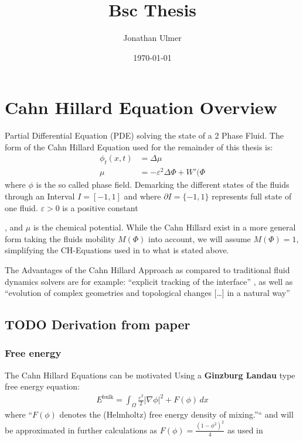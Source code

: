 \documentclass[11pt]{article}
\author{Jonathan Ulmer}
\date{\today}
\title{Bsc Thesis}
\begin{document}
\maketitle
\tableofcontents

\section{Cahn Hillard Equation Overview}
\label{sec:org31147c6}
Partial Differential Equation (PDE) solving the state of a 2 Phase Fluid\autocite{Wu_2022}. The form of the Cahn Hillard Equation used for the remainder of this thesis is:
\begin{align}
\phi _t(x,t) &=  \Delta  \mu \\
\mu &= - \varepsilon^2 \Delta \Phi  + W'(\Phi
\end{align}
where \(\phi\) is the so called phase field. Demarking the different states of the fluids through an Interval \(I=[-1,1]\) and where \(\partial I = \{-1,1\}\)  represents full state of one fluid. \(\varepsilon > 0\) is  a positive constant

, and \(\mu\) is the chemical potential\autocite{Wu_2022}. While the Cahn Hillard exist in a more general form taking the fluids mobility \(M(\Phi)\) into account, we will assume \(M(\Phi) = 1\), simplifying the CH-Equations used in\autocite{Wu_2022}\autocite{SHIN20117441} to what is stated above.


The Advantages of the Cahn Hillard Approach as compared to traditional fluid dynamics solvers are for example: ``explicit tracking of the interface'' \autocite{Wu_2022}, as well as ``evolution of complex geometries and topological changes [\ldots{}] in a natural way'' \autocite{Wu_2022}
\subsection{{\bfseries\sffamily TODO} Derivation from paper}
\label{sec:orge0bc234}
\subsubsection{Free energy}
\label{sec:orgaeb3229}
The Cahn Hillard Equations can be motivated Using a \textbf{Ginzburg Landau} type free energy equation:
\begin{align*}
E^{\text{bulk}}  = \int_{  \Omega}  \frac{\varepsilon^2}{2} |\nabla \phi |^2 + F(\phi) \,dx
\end{align*}
where ``\(F(\phi)\)  denotes the (Helmholtz) free energy density of mixing.''`` \autocite{Wu_2022} and will be approximated in further calculations as \(F(\phi) = \frac{(1-\phi ^2)^2}{4}\) as used in\autocite{SHIN20117441}
\end{document}
